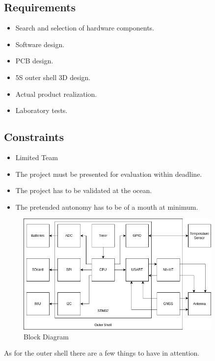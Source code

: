 \subsection{Requirements}
\begin{itemize}
    \item Search and selection of hardware components.
    \item Software design.
    \item PCB design.
    \item 5S outer shell 3D design.
    \item Actual product realization.
    \item Laboratory tests.
\end{itemize}
\subsection{Constraints}
\begin{itemize}
    \item Limited Team
    \item The project must be presented for evaluation within deadline.
    \item The project has to be validated at the ocean.
    \item The pretended autonomy has to be of a mouth at minimum.
\end{itemize}


\begin{figure}[H]
    \centering
    \includegraphics[width=0.9\textwidth]{images/diagrams/block_diagram/block_diagram_2/block_diagram.png}  %
    \caption{Block Diagram}
    \label{fig:Block Diagram}        
\end{figure}


As for the outer shell there are a few things to have in attention. 

